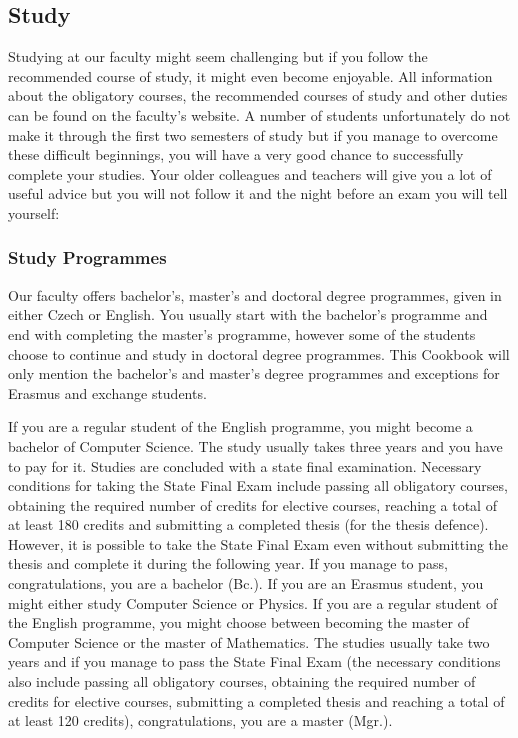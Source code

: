 \subsection{Study}
Studying at our faculty might seem challenging but if you follow the recommended
course of study, it might even become enjoyable.
All information about the obligatory courses, the recommended courses of study
and other duties can be found on the faculty's website.
A number of students unfortunately do not make it through the first two
semesters of study but if you manage to overcome these difficult beginnings, you
will have a very good chance to successfully complete your studies.
Your older colleagues and teachers will give you a lot of useful advice but you
will not follow it and the night before an exam you will tell yourself: 


\subsubsection{Study Programmes}

Our faculty offers bachelor’s, master’s and doctoral degree programmes, given in
either Czech or English. You usually start with the bachelor's programme and end
with completing the master's programme, however some of the students choose to
continue and study in doctoral degree programmes. This Cookbook will only
mention the bachelor's and master's degree programmes and exceptions for Erasmus
and exchange students.

If you are a regular student of the English programme, you might become a
bachelor of Computer Science.
The study usually takes three years and you have to pay for it. Studies are
concluded with a state final examination. Necessary conditions for taking the
State Final Exam include passing all obligatory courses, obtaining the required
number of credits for elective courses, reaching a total of at least 180 credits
and submitting a completed thesis (for the thesis defence). However, it is
possible to take the State Final Exam even without submitting the thesis and
complete it during the following year.
If you manage to pass, congratulations, you are a bachelor (Bc.).
If you are an Erasmus student, you might either study Computer Science or
Physics.
\vspace{5pt}
If you are a regular student of the English programme, you might choose between
becoming the master of Computer Science or the master of Mathematics. The
studies usually take two years and if you manage to pass the State Final Exam
(the necessary conditions also include passing all obligatory courses, obtaining
the required number of credits for elective courses, submitting a completed
thesis and reaching a total of at least 120 credits), congratulations, you are a
master (Mgr.).



